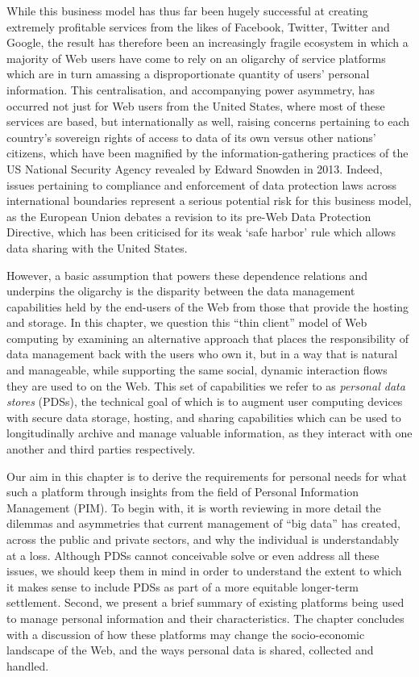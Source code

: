 \documentclass[runningheads,a4paper]{llncs}
\begin{document}
While this business model has thus far been hugely successful at creating extremely profitable services from the likes of Facebook, Twitter, Twitter and Google, the result has therefore been an increasingly fragile ecosystem in which a majority of Web users have come to rely on an oligarchy of service platforms which are in turn amassing a disproportionate quantity of users' personal information.  This centralisation, and accompanying power asymmetry, has occurred not just for Web users from the United States, where most of these services are based, but internationally as well, raising concerns pertaining to each country's sovereign rights of access to data of its own versus other nations' citizens, which have been magnified by the information-gathering practices of the US National Security Agency revealed by Edward Snowden in 2013. Indeed, issues pertaining to compliance and enforcement of data protection laws across international boundaries \cite{internationalownership} represent a serious potential risk for this business model, as the European Union debates a revision to its pre-Web Data Protection Directive, which has been criticised for its weak `safe harbor' rule which allows data sharing with the United States. 

However, a basic assumption that powers these dependence relations and underpins the oligarchy is the disparity between the data management capabilities held by the end-users of the Web from those that provide the hosting and storage. In this chapter, we question this ``thin client'' model of Web computing by examining an alternative approach that places the responsibility of data management back with the users who own it, but in a way that is natural and manageable, while supporting the same social, dynamic interaction flows they are used to on the Web.  This set of capabilities we refer to as \emph{personal data stores} (PDSs), the technical goal of which is to augment user computing devices with secure data storage, hosting, and sharing capabilities which can be used to longitudinally archive and manage valuable information, as they interact with one another and third parties respectively.  

Our aim in this chapter is to derive the requirements for personal needs for what such a platform through insights from the field of Personal Information Management (PIM). To begin with, it is worth reviewing in more detail the dilemmas and asymmetries that current management of ``big data'' has created, across the public and private sectors, and why the individual is understandably at a loss. Although PDSs cannot conceivable solve or even address all these issues, we should keep them in mind in order to understand the extent to which it makes sense to include PDSs as part of a more equitable longer-term settlement.  Second, we present a brief summary of existing platforms being used to manage personal information and their characteristics.  The chapter concludes with a discussion of how these platforms may change the socio-economic landscape of the Web, and the ways personal data is shared, collected and handled.
\end{document}
